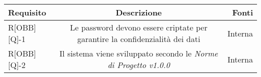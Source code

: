 \begin{center}
	\begin{tabular}{|l|c|r|}
		\toprule
		
		\textbf{Requisito} & \textbf{Descrizione} & \textbf{Fonti} \\
		
		\midrule
		R[OBB][Q]-1	& Le password devono essere criptate per garantire la confidenzialità dei dati & Interna \\ \midrule
		R[OBB][Q]-2 & Il sistema viene sviluppato secondo le \textit{Norme di Progetto v1.0.0} & Interna \\ \midrule
		
		\bottomrule
	\end{tabular}
\end{center}